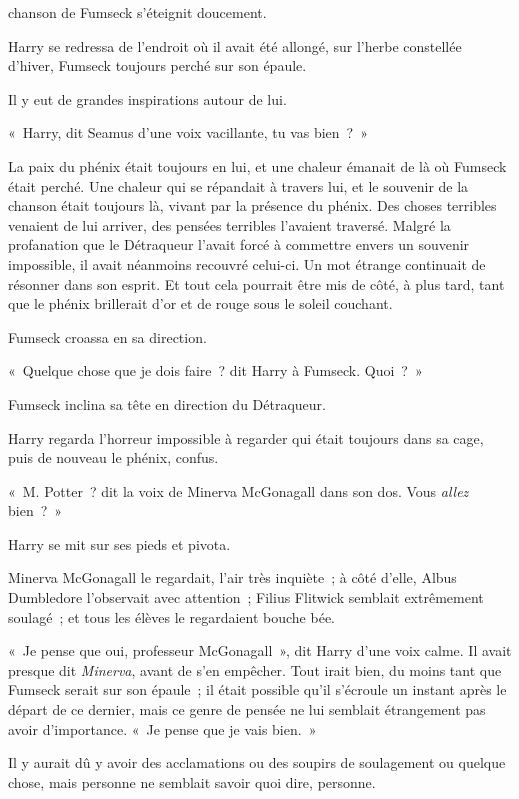 
 chanson de Fumseck s'éteignit doucement.

\hplettrineextrapara
Harry se redressa de l'endroit où il avait été allongé, sur l'herbe constellée d'hiver, Fumseck toujours perché sur son épaule.

Il y eut de grandes inspirations autour de lui.

«~Harry, dit Seamus d'une voix vacillante, tu vas bien~?~»

La paix du phénix était toujours en lui, et une chaleur émanait de là où Fumseck était perché.
Une chaleur qui se répandait à travers lui, et le souvenir de la chanson était toujours là, vivant par la présence du phénix.
Des choses terribles venaient de lui arriver, des pensées terribles l'avaient traversé.
Malgré la profanation que le Détraqueur l'avait forcé à commettre envers un souvenir impossible, il avait néanmoins recouvré celui-ci.
Un mot étrange continuait de résonner dans son esprit.
Et tout cela pourrait être mis de côté, à plus tard, tant que le phénix brillerait d'or et de rouge sous le soleil couchant.

Fumseck croassa en sa direction.

«~Quelque chose que je dois faire~? dit Harry à Fumseck.
Quoi~?~»

Fumseck inclina sa tête en direction du Détraqueur.

Harry regarda l'horreur impossible à regarder qui était toujours dans sa cage, puis de nouveau le phénix, confus.

«~M. Potter~? dit la voix de Minerva McGonagall dans son dos.
Vous \emph{allez} bien~?~»

Harry se mit sur ses pieds et pivota.

Minerva McGonagall le regardait, l'air très inquiète~; à côté d'elle, Albus Dumbledore l'observait avec attention~; Filius Flitwick semblait extrêmement soulagé~; et tous les élèves le regardaient bouche bée.

«~Je pense que oui, professeur McGonagall~», dit Harry d'une voix calme.
Il avait presque dit \emph{Minerva}, avant de s'en empêcher.
Tout irait bien, du moins tant que Fumseck serait sur son épaule~; il était possible qu'il s'écroule un instant après le départ de ce dernier, mais ce genre de pensée ne lui semblait étrangement pas avoir d'importance.
«~Je pense que je vais bien.~»

Il y aurait dû y avoir des acclamations ou des soupirs de soulagement ou quelque chose, mais personne ne semblait savoir quoi dire, personne.

